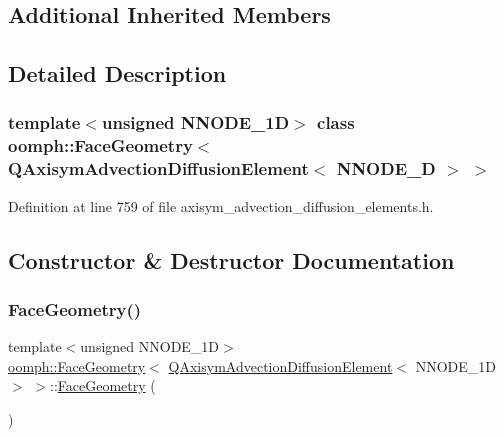 \subsection*{Additional Inherited Members}


\subsection{Detailed Description}
\subsubsection*{template$<$unsigned N\+N\+O\+D\+E\+\_\+1D$>$\newline
class oomph\+::\+Face\+Geometry$<$ Q\+Axisym\+Advection\+Diffusion\+Element$<$ N\+N\+O\+D\+E\+\_\+D $>$ $>$}



Definition at line 759 of file axisym\+\_\+advection\+\_\+diffusion\+\_\+elements.\+h.



\subsection{Constructor \& Destructor Documentation}
\mbox{\label{classoomph_1_1FaceGeometry_3_01QAxisymAdvectionDiffusionElement_3_01NNODE__1D_01_4_01_4_a7c174f03870a2be3a784a71044ae2810}} 
\subsubsection{\texorpdfstring{Face\+Geometry()}{FaceGeometry()}}
{\footnotesize\ttfamily template$<$unsigned N\+N\+O\+D\+E\+\_\+1D$>$ \\
\hyperlink{classoomph_1_1FaceGeometry}{oomph\+::\+Face\+Geometry}$<$ \hyperlink{classoomph_1_1QAxisymAdvectionDiffusionElement}{Q\+Axisym\+Advection\+Diffusion\+Element}$<$ N\+N\+O\+D\+E\+\_\+1D $>$ $>$\+::\hyperlink{classoomph_1_1FaceGeometry}{Face\+Geometry} (\begin{DoxyParamCaption}{ }\end{DoxyParamCaption})\hspace{0.3cm}{\ttfamily [inline]}}



